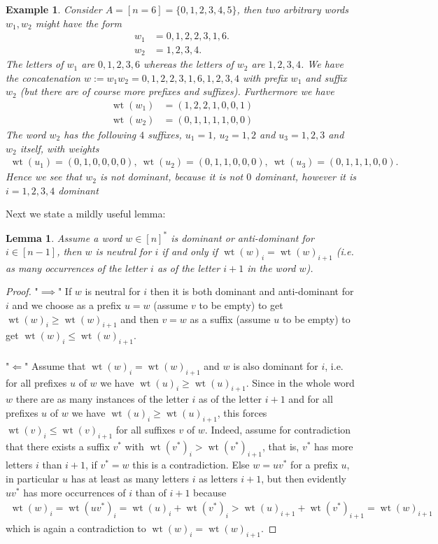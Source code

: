\documentclass{article}
\newtheorem{lem}{Lemma}
\newtheorem{exmp}{Example}
\DeclareMathOperator{\wt}{wt}
\begin{document}
\begin{exmp}
Consider $A=[n=6]=\{0,1,2,3,4,5\}$, then two arbitrary words $w_1,w_2$ might have the form 
\begin{align*}
    w_1 &= 0,1,2,2,3,1,6. \\
    w_2 &= 1,2,3,4.
\end{align*}
The letters of $w_1$ are $0,1,2,3,6$ whereas the letters of $w_2$ are $1,2,3,4$. We have the concatenation $w:=w_1w_2=0,1,2,2,3,1,6,1,2,3,4$ with prefix $w_1$ and suffix $w_2$ (but there are of course more prefixes and suffixes). Furthermore we have 
\begin{align*}
    \wt(w_1)&=(1,2,2,1,0,0,1) \\
    \wt(w_2)&=(0,1,1,1,1,0,0)
\end{align*}
The word $w_2$ has the following $4$ suffixes, $u_1=1$, $u_2=1,2$ and $u_3=1,2,3$ and $w_2$ itself, with weights 
\begin{align*}
    \wt(u_1)=(0,1,0,0,0,0), \ \wt(u_2)=(0,1,1,0,0,0), \ \wt(u_3)=(0,1,1,1,0,0).
\end{align*}
Hence we see that $w_2$ is not dominant, because it is not $0$ dominant, however it is $i=1,2,3,4$ dominant
\end{exmp}
Next we state a mildly useful lemma:
\begin{lem}
Assume a word $w \in [n]^*$ is dominant or anti-dominant for $i \in [n-1]$, then $w$ is neutral for $i$ if and only if $\wt(w)_i = \wt(w)_{i+1}$ (i.e. as many occurrences of the letter $i$ as of the letter $i+1$ in the word $w$). 
\end{lem}
\begin{proof}
"$\implies$" If $w$ is neutral for $i$ then it is both dominant and anti-dominant for $i$ and we choose as a prefix $u=w$ (assume $v$ to be empty) to get $\wt(w)_i \geq \wt(w)_{i+1}$ and then $v=w$ as a suffix (assume $u$ to be empty) to get $\wt(w)_i \leq \wt(w)_{i+1}$. 
\\\\
"$\Longleftarrow$" Assume that $\wt(w)_i = \wt(w)_{i+1}$ and $w$ is also dominant for $i$, i.e. for all prefixes $u$ of $w$ we have $\wt(u)_i \geq \wt(u)_{i+1}$. Since in the whole word $w$ there are as many instances of the letter $i$ as of the letter $i+1$ and for all prefixes $u$ of $w$ we have $\wt(u)_i \geq \wt(u)_{i+1}$, this forces $\wt(v)_i \leq \wt(v)_{i+1}$ for all suffixes $v$ of $w$. Indeed, assume for contradiction that there exists a suffix $v^*$ with $\wt(v^*)_i > \wt(v^*)_{i+1}$, that is, $v^*$ has more letters $i$ than $i+1$, if $v^*=w$ this is a contradiction. Else $w=uv^*$ for a prefix $u$, in particular $u$ has at least as many letters $i$ as letters $i+1$, but then evidently $uv^*$ has more occurrences of $i$ than of $i+1$ because \begin{align*}
    \wt(w)_i = \wt(uv^*)_i = \wt(u)_i + \wt(v^*)_i > \wt(u)_{i+1} + \wt(v^*)_{i+1} = \wt(w)_{i+1}
\end{align*}
 which is again a contradiction to $\wt(w)_i=\wt(w)_{i+1}$.
\end{proof}
\end{document}
